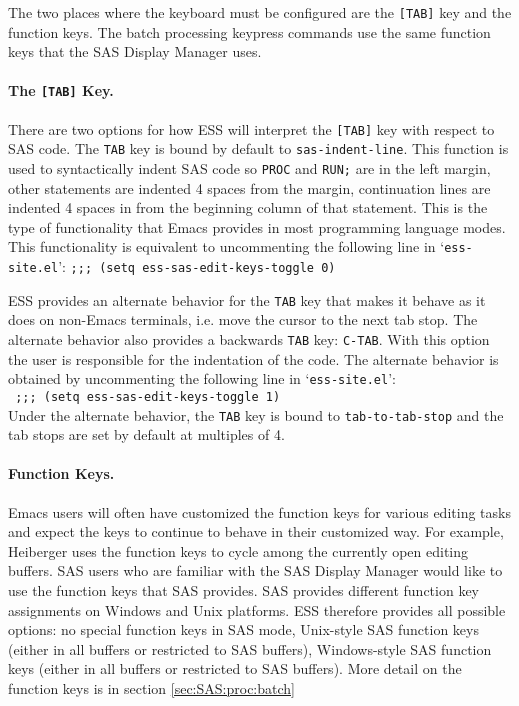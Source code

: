 \documentclass{article}
\newcommand{\stexttt}[1]{{\small\texttt{#1}}}
\newcommand{\elcode}[1]{\\{\stexttt{\hspace*{2em} #1}}\\}
\newcommand{\file}[1]{`\stexttt{#1}'}
\begin{document}
The two places where the keyboard must be configured are the
\texttt{[TAB]} key and the function keys.  The batch processing
keypress commands use the same function keys that the SAS Display
Manager uses.

\paragraph{The \texttt{[TAB]} Key.}
\label{sec:SAS:tab}

There are two options for how ESS will interpret the \stexttt{[TAB]}
key with respect to SAS code.  The \stexttt{TAB} key is bound by
default to \stexttt{sas-indent-line}.  This function is used to
syntactically indent SAS code so \stexttt{PROC} and \stexttt{RUN;} are
in the left margin, other statements are indented 4 spaces from the
margin, continuation lines are indented 4 spaces in from the beginning
column of that statement.  This is the type of functionality that
Emacs provides in most programming language modes.  This functionality
is equivalent to uncommenting the following line in
\file{ess-site.el}: \stexttt{;;; (setq ess-sas-edit-keys-toggle 0)}

ESS provides an alternate behavior for the \stexttt{TAB} key that
makes it behave as it does on non-Emacs terminals, i.e. move the
cursor to the next tab stop.  The alternate behavior also provides a
backwards \stexttt{TAB} key: \stexttt{C-TAB}.  With this option the
user is responsible for the indentation of the code.  The alternate
behavior is obtained by uncommenting the following line in
\file{ess-site.el}: \elcode{;;; (setq ess-sas-edit-keys-toggle 1)}
Under the alternate behavior, the \stexttt{TAB} key is bound to
\stexttt{tab-to-tab-stop} and the tab stops are set by default at
multiples of 4.

\paragraph{Function Keys.}
Emacs users will often have customized the function keys for various
editing tasks and expect the keys to continue to behave in their
customized way.  For example, Heiberger uses the function keys to
cycle among the currently open editing buffers.  SAS users who are
familiar with the SAS Display Manager would like to use the function
keys that SAS provides.  SAS provides different function key
assignments on Windows and Unix platforms.  ESS therefore provides all
possible options: no special function keys in SAS mode, Unix-style SAS
function keys (either in all buffers or restricted to SAS buffers),
Windows-style SAS function keys (either in all buffers or restricted
to SAS buffers).  More detail on the function keys is in section
\ref{sec:SAS:proc:batch}
\end{document}
